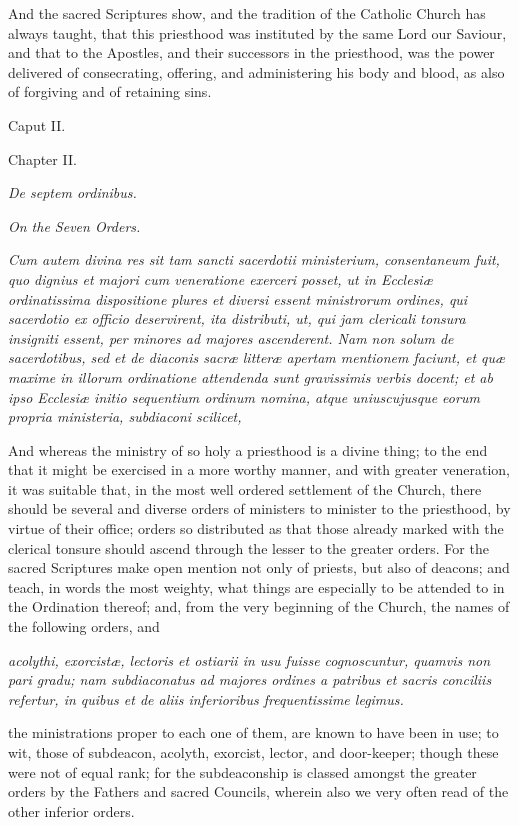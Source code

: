 And the sacred Scriptures show, and the tradition of the Catholic Church has always taught, that this priesthood was instituted by the same Lord our Saviour, and that to the Apostles, and their successors in the priesthood, was the power delivered of consecrating, offering, and administering his body and blood, as also of forgiving and of retaining sins.

Caput II.

Chapter II.

\emph{De septem ordinibus.}

\emph{On the Seven Orders.}

\emph{Cum autem divina res sit tam sancti sacerdotii ministerium, consentaneum fuit, quo dignius et majori cum veneratione exerceri posset, ut in Ecclesiæ ordinatissima dispositione plures et diversi essent ministrorum ordines, qui sacerdotio ex officio deservirent, ita distributi, ut, qui jam clericali tonsura insigniti essent, per minores ad majores ascenderent. Nam non solum de sacerdotibus, sed et de diaconis sacræ litteræ apertam mentionem faciunt, et quæ maxime in illorum ordinatione attendenda sunt gravissimis verbis docent; et ab ipso Ecclesiæ initio sequentium ordinum nomina, atque uniuscujusque eorum propria ministeria, subdiaconi scilicet, }

And whereas the ministry of so holy a priesthood is a divine thing; to the end that it might be exercised in a more worthy manner, and with greater veneration, it was suitable that, in the most well ordered settlement of the Church, there should be several and diverse orders of ministers to minister to the priesthood, by virtue of their office; orders so distributed as that those already marked with the clerical tonsure should ascend through the lesser to the greater orders. For the sacred Scriptures make open mention not only of priests, but also of deacons; and teach, in words the most weighty, what things are especially to be attended to in the Ordination thereof; and, from the very beginning of the Church, the names of the following orders, and

\emph{acolythi, exorcistæ, lectoris et ostiarii in usu fuisse cognoscuntur, quamvis non pari gradu; nam subdiaconatus ad majores ordines a patribus et sacris conciliis refertur, in quibus et de aliis inferioribus frequentissime legimus.}

the ministrations proper to each one of them, are known to have been in use; to wit, those of subdeacon, acolyth, exorcist, lector, and door-keeper; though these were not of equal rank; for the subdeaconship is classed amongst the greater orders by the Fathers and sacred Councils, wherein also we very often read of the other inferior orders.

